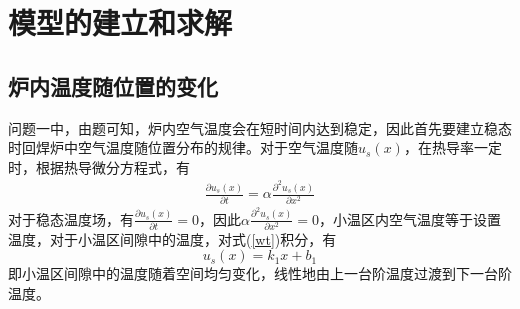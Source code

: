\documentclass[withoutpreface,bwprint]{cumcmthesis} %
\begin{document}
	
	\section{模型的建立和求解}
	\subsection{炉内温度随位置的变化}
	问题一中，由题可知，炉内空气温度会在短时间内达到稳定，因此首先要建立稳态时回焊炉中空气温度随位置分布的规律。对于空气温度随$u_s(x)$，在热导率一定时，根据热导微分方程式，有
	\begin{align}
	\frac{\partial u_s(x)}{\partial t}=\alpha\frac{\partial^2u_s(x)}{\partial x^2}
	\label{wt}
	\end{align}
	对于稳态温度场，有$\frac{\partial u_s(x)}{\partial t}=0$，因此$\alpha\frac{\partial^2u_s(x)}{\partial x^2}=0$，小温区内空气温度等于设置温度，对于小温区间隙中的温度，对式(\ref{wt})积分，有
	\begin{equation}\label{key}
	u_s(x)=k_1 x+b_1
	\end{equation}
	即小温区间隙中的温度随着空间均匀变化，线性地由上一台阶温度过渡到下一台阶温度。
	
\end{document}
